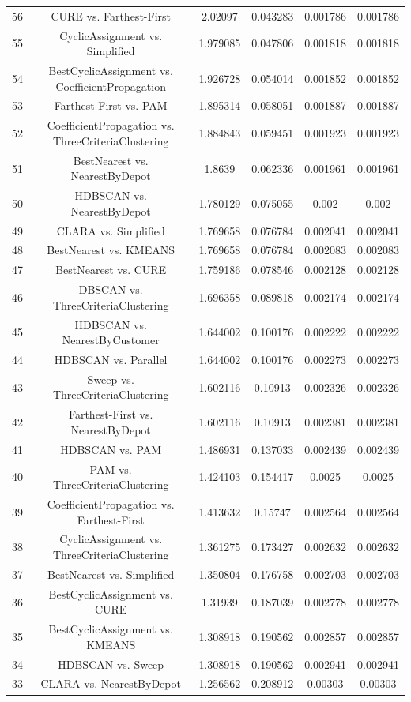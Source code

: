 \documentclass[a4paper,10pt]{article}
\begin{document}
\begin{landscape}
\begin{table}[!htp]
\begin{tabular}{cccccc}
56&CURE vs. Farthest-First&2.02097&0.043283&0.001786&0.001786\\
55&CyclicAssignment vs. Simplified&1.979085&0.047806&0.001818&0.001818\\
54&BestCyclicAssignment vs. CoefficientPropagation&1.926728&0.054014&0.001852&0.001852\\
53&Farthest-First vs. PAM&1.895314&0.058051&0.001887&0.001887\\
52&CoefficientPropagation vs. ThreeCriteriaClustering&1.884843&0.059451&0.001923&0.001923\\
51&BestNearest vs. NearestByDepot&1.8639&0.062336&0.001961&0.001961\\
50&HDBSCAN vs. NearestByDepot&1.780129&0.075055&0.002&0.002\\
49&CLARA vs. Simplified&1.769658&0.076784&0.002041&0.002041\\
48&BestNearest vs. KMEANS&1.769658&0.076784&0.002083&0.002083\\
47&BestNearest vs. CURE&1.759186&0.078546&0.002128&0.002128\\
46&DBSCAN vs. ThreeCriteriaClustering&1.696358&0.089818&0.002174&0.002174\\
45&HDBSCAN vs. NearestByCustomer&1.644002&0.100176&0.002222&0.002222\\
44&HDBSCAN vs. Parallel&1.644002&0.100176&0.002273&0.002273\\
43&Sweep vs. ThreeCriteriaClustering&1.602116&0.10913&0.002326&0.002326\\
42&Farthest-First vs. NearestByDepot&1.602116&0.10913&0.002381&0.002381\\
41&HDBSCAN vs. PAM&1.486931&0.137033&0.002439&0.002439\\
40&PAM vs. ThreeCriteriaClustering&1.424103&0.154417&0.0025&0.0025\\
39&CoefficientPropagation vs. Farthest-First&1.413632&0.15747&0.002564&0.002564\\
38&CyclicAssignment vs. ThreeCriteriaClustering&1.361275&0.173427&0.002632&0.002632\\
37&BestNearest vs. Simplified&1.350804&0.176758&0.002703&0.002703\\
36&BestCyclicAssignment vs. CURE&1.31939&0.187039&0.002778&0.002778\\
35&BestCyclicAssignment vs. KMEANS&1.308918&0.190562&0.002857&0.002857\\
34&HDBSCAN vs. Sweep&1.308918&0.190562&0.002941&0.002941\\
33&CLARA vs. NearestByDepot&1.256562&0.208912&0.00303&0.00303\\

\end{tabular}
\end{table}
\end{landscape}
\end{document}
